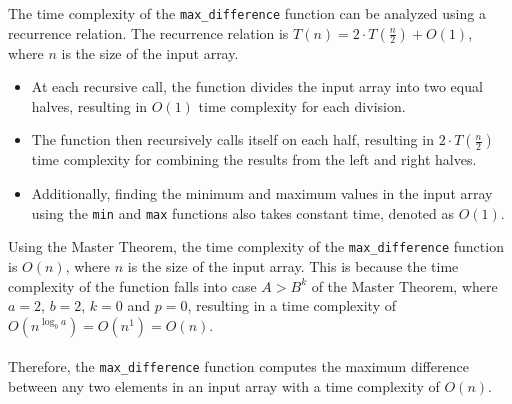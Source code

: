 \documentclass{article}
\begin{document}
The time complexity of the \texttt{max\_difference} function can be analyzed using a recurrence relation. The recurrence relation is \(T(n) = 2 \cdot T\left(\frac{n}{2}\right) + O(1)\), where \(n\) is the size of the input array.

\begin{itemize}
    \item At each recursive call, the function divides the input array into two equal halves, resulting in \(O(1)\) time complexity for each division.
    \item The function then recursively calls itself on each half, resulting in \(2 \cdot T\left(\frac{n}{2}\right)\) time complexity for combining the results from the left and right halves.
    \item Additionally, finding the minimum and maximum values in the input array using the \texttt{min} and \texttt{max} functions also takes constant time, denoted as \(O(1)\).
\end{itemize}
Using the Master Theorem, the time complexity of the \texttt{max\_difference} function is \(O(n)\), where \(n\) is the size of the input array. This is because the time complexity of the function falls into case \( A > B^{k}\) of the Master Theorem, where \(a = 2\), \(b = 2\), \(k = 0\) and \(p = 0\), resulting in a time complexity of \(O(n^{\log_b a}) = O(n^1) = O(n)\).
\\\\Therefore, the \texttt{max\_difference} function computes the maximum difference between any two elements in an input array with a time complexity of \(O(n)\).
\end{document}
